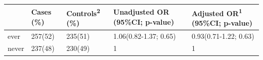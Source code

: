 \begin{longtable}[]{@{}lllll@{}}
\toprule
\begin{minipage}[b]{0.06\columnwidth}\raggedright
\strut
\end{minipage} & \begin{minipage}[b]{0.10\columnwidth}\raggedright
Cases (\%)\strut
\end{minipage} & \begin{minipage}[b]{0.12\columnwidth}\raggedright
Controls\textsuperscript{2} (\%)\strut
\end{minipage} & \begin{minipage}[b]{0.28\columnwidth}\raggedright
Unadjusted OR (95\%CI; p-value)\strut
\end{minipage} & \begin{minipage}[b]{0.29\columnwidth}\raggedright
Adjusted OR\textsuperscript{1} (95\%CI; p-value)\strut
\end{minipage}\tabularnewline
\midrule
\endhead
\begin{minipage}[t]{0.06\columnwidth}\raggedright
ever\strut
\end{minipage} & \begin{minipage}[t]{0.10\columnwidth}\raggedright
257(52)\strut
\end{minipage} & \begin{minipage}[t]{0.12\columnwidth}\raggedright
235(51)\strut
\end{minipage} & \begin{minipage}[t]{0.28\columnwidth}\raggedright
1.06(0.82-1.37; 0.65)\strut
\end{minipage} & \begin{minipage}[t]{0.29\columnwidth}\raggedright
0.93(0.71-1.22; 0.63)\strut
\end{minipage}\tabularnewline
\begin{minipage}[t]{0.06\columnwidth}\raggedright
never\strut
\end{minipage} & \begin{minipage}[t]{0.10\columnwidth}\raggedright
237(48)\strut
\end{minipage} & \begin{minipage}[t]{0.12\columnwidth}\raggedright
230(49)\strut
\end{minipage} & \begin{minipage}[t]{0.28\columnwidth}\raggedright
1\strut
\end{minipage} & \begin{minipage}[t]{0.29\columnwidth}\raggedright
1\strut
\end{minipage}\tabularnewline
\bottomrule
\end{longtable}

